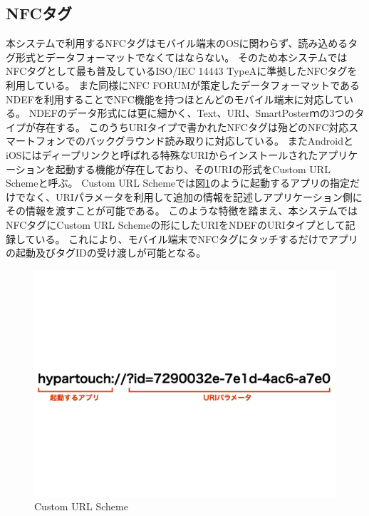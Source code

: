 \subsection{NFCタグ}
本システムで利用するNFCタグはモバイル端末のOSに関わらず、読み込めるタグ形式とデータフォーマットでなくてはならない。
そのため本システムではNFCタグとして最も普及しているISO/IEC 14443 TypeAに準拠したNFCタグを利用している。
また同様にNFC FORUMが策定したデータフォーマットであるNDEFを利用することでNFC機能を持つほとんどのモバイル端末に対応している。
NDEFのデータ形式には更に細かく、Text、URI、SmartPosterｍの3つのタイプが存在する。
このうちURIタイプで書かれたNFCタグは殆どのNFC対応スマートフォンでのバックグラウンド読み取りに対応している。
またAndroidとiOSにはディープリンクと呼ばれる特殊なURIからインストールされたアプリケーションを起動する機能が存在しており、そのURIの形式をCustom URL Schemeと呼ぶ。
Custom URL Schemeでは図\ref{fig:custom_url_scheme}のように起動するアプリの指定だけでなく、URIパラメータを利用して追加の情報を記述しアプリケーション側にその情報を渡すことが可能である。
このような特徴を踏まえ、本システムではNFCタグにCustom URL Schemeの形にしたURIをNDEFのURIタイプとして記録している。
これにより、モバイル端末でNFCタグにタッチするだけでアプリの起動及びタグIDの受け渡しが可能となる。

\begin{figure}[h]
  \centering
  \includegraphics[width=150mm]{images/custom_url_scheme.jpg}
  \caption{Custom URL Scheme} \label{fig:custom_url_scheme}
\end{figure}




